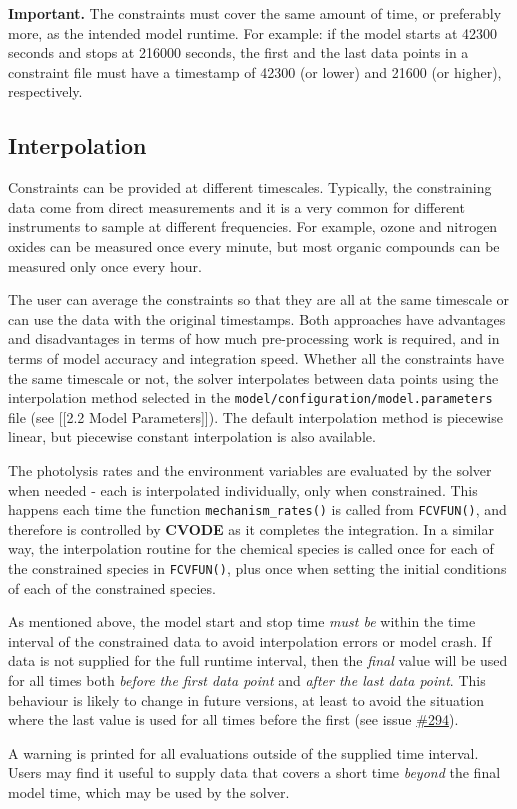 \textbf{Important.} The constraints must cover the same amount of time,
or preferably more, as the intended model runtime. For example: if the
model starts at 42300 seconds and stops at 216000 seconds, the first and
the last data points in a constraint file must have a timestamp of 42300
(or lower) and 21600 (or higher), respectively.

\subsection{Interpolation}\label{interpolation}

Constraints can be provided at different timescales. Typically, the
constraining data come from direct measurements and it is a very common
for different instruments to sample at different frequencies. For
example, ozone and nitrogen oxides can be measured once every minute,
but most organic compounds can be measured only once every hour.

The user can average the constraints so that they are all at the same
timescale or can use the data with the original timestamps. Both
approaches have advantages and disadvantages in terms of how much
pre-processing work is required, and in terms of model accuracy and
integration speed. Whether all the constraints have the same timescale
or not, the solver interpolates between data points using the
interpolation method selected in the
\texttt{model/configuration/model.parameters} file (see {[}{[}2.2 Model
Parameters{]}{]}). The default interpolation method is piecewise linear,
but piecewise constant interpolation is also available.

The photolysis rates and the environment variables are evaluated by the
solver when needed - each is interpolated individually, only when
constrained. This happens each time the function
\texttt{mechanism\_rates()} is called from \texttt{FCVFUN()}, and
therefore is controlled by \textbf{CVODE} as it completes the
integration. In a similar way, the interpolation routine for the
chemical species is called once for each of the constrained species in
\texttt{FCVFUN()}, plus once when setting the initial conditions of each
of the constrained species.

As mentioned above, the model start and stop time \emph{must be} within
the time interval of the constrained data to avoid interpolation errors
or model crash. If data is not supplied for the full runtime interval,
then the \emph{final} value will be used for all times both \emph{before
the first data point} and \emph{after the last data point}. This
behaviour is likely to change in future versions, at least to avoid the
situation where the last value is used for all times before the first
(see issue \href{https://github.com/AtChem/AtChem2/issues/294}{\#294}).

A warning is printed for all evaluations outside of the supplied time
interval. Users may find it useful to supply data that covers a short
time \emph{beyond} the final model time, which may be used by the
solver.
